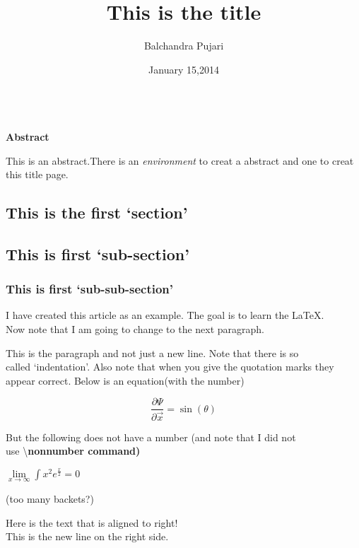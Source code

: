\documentclass{article}
\title{This is the title}
\author{Balchandra Pujari}
\date{January 15,2014}
\begin{document}
\maketitle
\small \bf{\\Abstract}
\begin{flushleft}
\hspace{3 mm}
{This is an abstract.There is an {\it environment} to creat a abstract and one to creat this title page.}
\end{flushleft}
\vspace{3 mm}
\begin{flushleft}
\section{\Large\bf This is the first `section'}
\subsection{\normalsize This is first `sub-section'}
\subsubsection{\small This is first `sub-sub-section'}
 I have created this article as an example. The goal is to learn the \LaTeX{}. \\ Now note that I am going to change to the next paragraph.

This is the paragraph and not just a new line. Note that there is so \\ called `indentation'. Also note that when you give the quotation marks they \\ appear correct. Below is an equation(with the number)
\end{flushleft}
\begin{center}
\begin{equation}
\frac{\partial \Psi}{\partial \vec{x}}=\sin({\theta})
\end{equation}
\end{center}
\begin{flushleft}
{\normalsize But the following does not have a number (and note that I did not \\ use \textbackslash \bf{nonnumber} command)}
\end{flushleft}
\begin{center}
$\lim \limits_{x \rightarrow \infty} \int{x^2}{e^{\frac{x}{2}}}=0$
\end{center}
\begin{flushleft}
{(too many backets?)}
\end{flushleft}
\begin{flushright}
{Here is the text that is aligned to right!\\This is the new line on the right side.}
\end{flushright}
\end{document}
